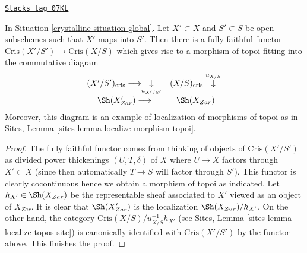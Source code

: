 \begin{lemma}[Localize]
\label{crystalline-lemma-localize}
\href{https://stacks.math.columbia.edu/tag/07KL}{\texttt{Stacks tag 07KL}}

In Situation \ref{crystalline-situation-global}.
Let $X' \subset X$ and $S' \subset S$ be open subschemes such that
$X'$ maps into $S'$. Then there is a fully faithful functor
$\text{Cris}(X'/S') \to \text{Cris}(X/S)$
which gives rise to a morphism of topoi fitting into the commutative
diagram
$$
\begin{array}{cc}(X'/S')_{\text{cris}} \longrightarrow\underset{u_{X'/S'}}{\downarrow} & (X/S)_{\text{cris}} \overset{u_{X/S}}{\downarrow} \\ \Sh(X'_{Zar}) \longrightarrow & \Sh(X_{Zar})\end{array}
$$
Moreover, this diagram is an example of localization of morphisms of
topoi as in Sites, Lemma \ref{sites-lemma-localize-morphism-topoi}.
\end{lemma}

\begin{proof}
The fully faithful functor comes from thinking of
objects of $\text{Cris}(X'/S')$ as divided power
thickenings $(U, T, \delta)$ of $X$ where $U \to X$
factors through $X' \subset X$ (since then automatically $T \to S$
will factor through $S'$). This functor is clearly cocontinuous
hence we obtain a morphism of topoi as indicated.
Let $h_{X'} \in \Sh(X_{Zar})$ be the representable sheaf associated
to $X'$ viewed as an object of $X_{Zar}$. It is clear that
$\Sh(X'_{Zar})$ is the localization $\Sh(X_{Zar})/h_{X'}$.
On the other hand, the category $\text{Cris}(X/S)/u_{X/S}^{-1}h_{X'}$
(see Sites, Lemma \ref{sites-lemma-localize-topos-site})
is canonically identified with $\text{Cris}(X'/S')$ by the functor above.
This finishes the proof.
\end{proof}

